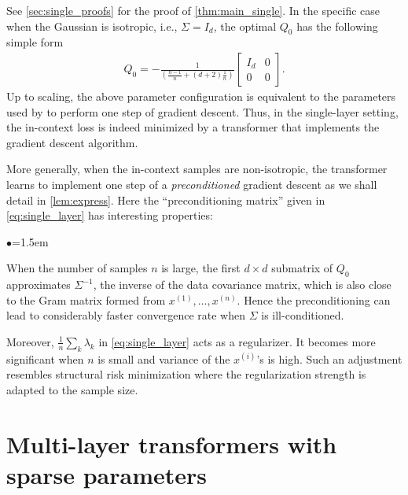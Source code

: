 \documentclass{article}
\newcommand{\tx}[1]{x^{(#1)}}
\begin{document}
See \autoref{sec:single_proofs} for the proof of \autoref{thm:main_single}. In the specific case when the Gaussian is isotropic, i.e., $\Sigma = I_d$, the optimal $Q_0$ has the following simple form 
\begin{align} \label{minimum:linear}
Q_0 = - \frac{1}{\left( \frac{n-1}{n} +  (d+2) \frac{1}{n} \right)}  \begin{bmatrix}I_d &0   \\ 0 &0\end{bmatrix}.
\end{align}
Up to scaling, the above parameter configuration is equivalent to the parameters used by \citet{von2022transformers} to perform one step of gradient descent. Thus, in the single-layer setting, the in-context loss is indeed minimized by a transformer that implements the gradient descent algorithm.

More generally, when the in-context samples are non-isotropic, the transformer learns to implement one step of a \emph{preconditioned} gradient descent as we shall detail in \autoref{lem:express}. Here the ``preconditioning matrix''  given in \eqref{eq:single_layer} has interesting properties:
\begin{list}{$\bullet$}{\leftmargin=1.5em}
\setlength{\itemsep}{1pt}
\item When the number of samples $n$ is large, the first $d\times d$ submatrix of $Q_0$ approximates $\Sigma^{-1}$, the inverse of the data covariance matrix, which is also close to the Gram matrix formed from $\tx{1},\ldots,\tx{n}$. Hence the preconditioning can lead to considerably faster convergence rate when $\Sigma$ is ill-conditioned.
\item Moreover, $\frac{1}{n} \sum_k \lambda_k$  in \eqref{eq:single_layer}  acts as a regularizer. It becomes more significant when $n$ is small and variance of the $\tx{i}$'s is high. Such an adjustment resembles structural risk minimization \citep{vapnik1999nature} where the regularization strength is adapted to the sample size.   
\end{list}








\section{Multi-layer transformers with sparse parameters}
\label{s:k_layer_Q}
\end{document}
